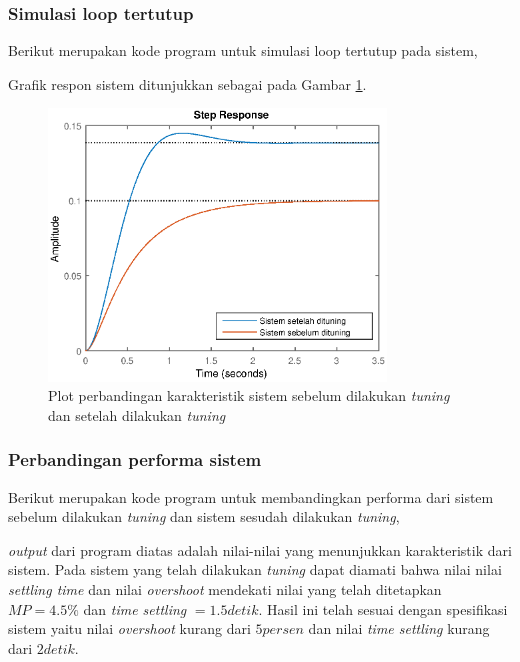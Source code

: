 \documentclass[../main.tex]{subfiles}
\begin{document}
                \subsubsection{Simulasi loop tertutup}
                    Berikut merupakan kode program untuk simulasi loop tertutup pada sistem,
                    
                    Grafik respon sistem ditunjukkan sebagai pada Gambar \ref{perbandingan_tuning}.
                    \begin{figure}[H]
                        \centering
                        \includegraphics[width = 0.8\textwidth]{assets/image/UJI_SISTEM_2_3_rev.eps}
                        \caption{Plot perbandingan karakteristik sistem sebelum dilakukan \textit{tuning} dan setelah dilakukan \textit{tuning}}
                        \label{perbandingan_tuning}
                    \end{figure}
                \subsubsection{Perbandingan performa sistem}
                    Berikut merupakan kode program untuk membandingkan performa dari sistem sebelum dilakukan \textit{tuning} dan sistem sesudah dilakukan \textit{tuning},
                    
                    \textit{output} dari program diatas adalah nilai-nilai yang menunjukkan karakteristik dari sistem. Pada sistem yang telah dilakukan \textit{tuning} dapat diamati bahwa nilai nilai \textit{settling time} dan nilai \textit{overshoot} mendekati nilai yang telah ditetapkan $MP = 4.5\%$ dan \textit{time settling} $ = 1.5 detik$. Hasil ini telah sesuai dengan spesifikasi sistem yaitu nilai \textit{overshoot} kurang dari $5 persen$ dan nilai \textit{time settling} kurang dari $2 detik$.
                    
\end{document}

